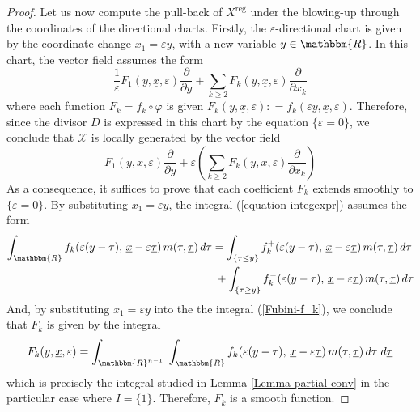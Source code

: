 \documentclass[11pt,psamsfonts]{article}
\theoremstyle{definition}
\theoremstyle{remark}
\newcommand{\cR}{\ensuremath{\mathbbm{R}}}
\newcommand{\eps}{\varepsilon }
\newcommand{\vf}{f}
\newcommand{\reg}{\mathrm{reg}}
\begin{document}
\begin{proof}
Let us now compute the pull-back of $X^\reg$ under the blowing-up through the coordinates of the directional charts.  Firstly, the $\eps$-directional chart is given by the coordinate change $x_1 = \eps  y$, with a new variable $y\in \cR$.  In this chart, the vector field assumes the form 
\[ 
 \frac{1}{\eps } F_1 \left( y, \underline{x}, \eps 
   \right) \frac{\partial}{\partial y} + \sum_{k \ge  2} F_k \left( y,
   \underline{x}, \eps  \right) \frac{\partial}{\partial x_k} \]
where each function $F_k = f_k \circ \varphi$ is given $F_k \left( y, \underline{x}, \eps  \right) : = f_k \left(
\eps  y, \underline{x}, \eps  \right)$. Therefore, since the divisor $D$ is expressed in this chart by the equation $\{\eps = 0\}$, we conclude that ${\mathcal{X}}$ 
is locally generated by the vector field
\begin{equation}\label{expression-calX}
  F_1 \left( y, \underline{x}, \eps 
   \right) \frac{\partial}{\partial y} + \eps \left(\sum_{k \ge  2} F_k \left( y,
   \underline{x}, \eps  \right) \frac{\partial}{\partial x_k}\right)
\end{equation}
As a consequence, it suffices to prove that each coefficient $F_k$ extends smoothly to $\{\eps = 0\}$. 
By substituting $x_1=\eps  y$, the integral (\ref{equation-integexpr}) assumes the form
\begin{align}\label{equation-integexprF}
\int_{\cR} 
   \vf_k\!\left( \eps  (y - \tau), \, \underline{x} - \eps  \underline{\tau} \right) 
   m \!\left( \tau, \underline{\tau} \right) d\tau
   &= \int_{\{ \tau \le  y \}} 
        \vf_k^+ \!\left( \eps  (y - \tau), \, \underline{x} - \eps  \underline{\tau} \right) 
        m \!\left( \tau, \underline{\tau} \right) d\tau  \\
   &\; + \int_{\{ \tau \ge  y \}} 
        \vf_k^- \!\left( \eps  (y - \tau), \, \underline{x} - \eps  \underline{\tau} \right) 
        m \!\left( \tau, \underline{\tau} \right) d\tau \notag
\end{align}
And, by substituting $x_1=\eps  y$ into the the integral (\ref{Fubini-f_k}), we conclude that $F_k$ is given by the integral
$$
F_k(y,\underline{x},\eps) = \int_{\cR^{n-1}} \; \int_{\cR} 
   \vf_k\!\left( \eps  (y - \tau), \, \underline{x} - \eps  \underline{\tau} \right) 
   m \!\left( \tau, \underline{\tau} \right) d\tau\; d\underline{\tau}
$$
which is precisely the integral studied in Lemma \ref{Lemma-partial-conv} in the particular case where $I=\{1\}$. Therefore, $F_k$ is a smooth function. 


\end{proof}
\end{document}
